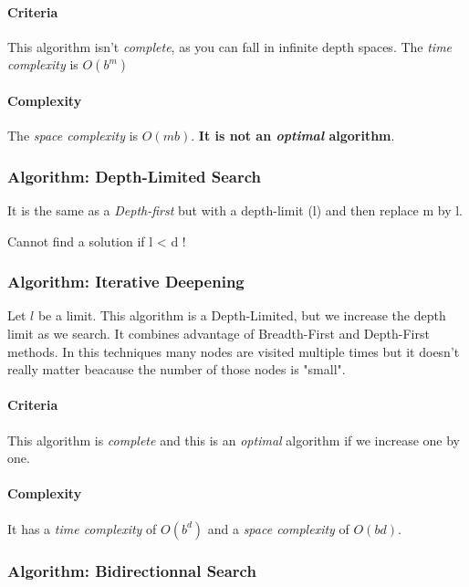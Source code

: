 \paragraph{Criteria}
This algorithm isn't \textit{complete}, as you can fall in infinite depth spaces. The \textit{time complexity} is $O(b^m)$ 

\paragraph{Complexity}
The \textit{space complexity} is $O(mb)$. \textbf{It is not an \textit{optimal} algorithm}.

\subsubsection{Algorithm: Depth-Limited Search}

It is the same as a \textit{Depth-first} but with a depth-limit (l) and
then replace m by l.

Cannot find a solution if l < d !

\subsubsection{Algorithm: Iterative Deepening}

Let $l$ be  a limit. This algorithm is a  Depth-Limited, but we increase
the depth limit as we search. It combines advantage of Breadth-First and
Depth-First methods. In this techniques  many nodes are visited multiple
times but it doesn't really matter beacause the number of those nodes is
"small".

\paragraph{Criteria} This algorithm is  \textit{complete} and this is an
\textit{optimal} algorithm if we increase one by one.

\paragraph{Complexity} It has a \textit{time complexity} of $O(b^d)$ and
a \textit{space complexity} of $O(bd)$.


\subsubsection{Algorithm: Bidirectionnal Search}

